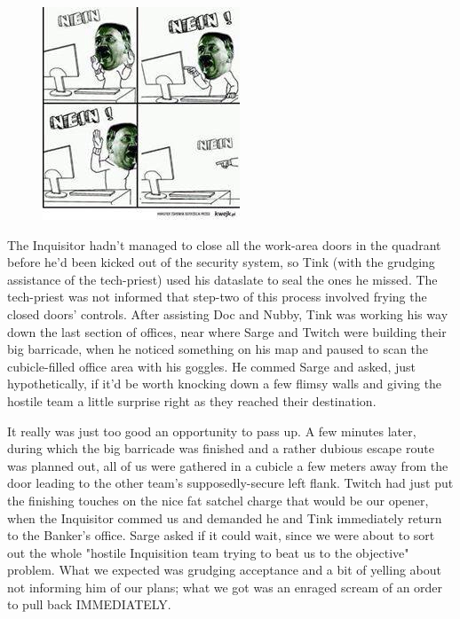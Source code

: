 \begin{figure}
	\begin{center}
		\includegraphics[width=\figwidth]{pics/18/31.png}
	\end{center}
\end{figure}
The Inquisitor hadn't managed to close all the work-area doors in the quadrant before he'd been kicked out of the security system, so Tink (with the grudging assistance of the tech-priest) used his dataslate to seal the ones he missed. 
The tech-priest was not informed that step-two of this process involved frying the closed doors' controls. 
After assisting Doc and Nubby, Tink was working his way down the last section of offices, near where Sarge and Twitch were building their big barricade, when he noticed something on his map and paused to scan the cubicle-filled office area with his goggles. 
He commed Sarge and asked, just hypothetically, if it'd be worth knocking down a few flimsy walls and giving the hostile team a little surprise right as they reached their destination.

It really was just too good an opportunity to pass up. 
A few minutes later, during which the big barricade was finished and a rather dubious escape route was planned out, all of us were gathered in a cubicle a few meters away from the door leading to the other team's supposedly-secure left flank. 
Twitch had just put the finishing touches on the nice fat satchel charge that would be our opener, when the Inquisitor commed us and demanded he and Tink immediately return to the Banker's office. 
Sarge asked if it could wait, since we were about to sort out the whole "hostile Inquisition team trying to beat us to the objective" problem. 
What we expected was grudging acceptance and a bit of yelling about not informing him of our plans; 
what we got was an enraged scream of an order to pull back IMMEDIATELY.

